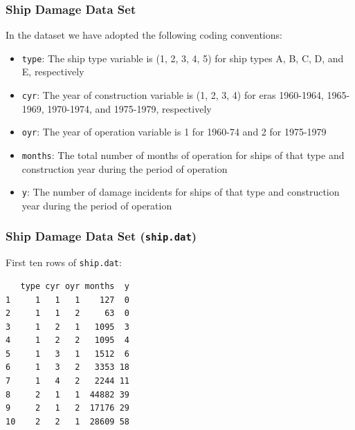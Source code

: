 \documentclass[oneside]{book}\usepackage[]{graphicx}\usepackage[svgnames]{xcolor}
\makeatletter
\newenvironment{kframe}{%
 \def\at@end@of@kframe{}%
 \ifinner\ifhmode%
  \def\at@end@of@kframe{\end{minipage}}%
  \begin{minipage}{\columnwidth}%
 \fi\fi%
 \def\FrameCommand##1{\hskip\@totalleftmargin \hskip-\fboxsep
 \colorbox{shadecolor}{##1}\hskip-\fboxsep
     \hskip-\linewidth \hskip-\@totalleftmargin \hskip\columnwidth}%
 \MakeFramed {\advance\hsize-\width
   \@totalleftmargin\z@ \linewidth\hsize
   \@setminipage}}%
 {\par\unskip\endMakeFramed%
 \at@end@of@kframe}
\newenvironment{knitrout}{}{} %
\makeatother
\begin{document}
\subsubsection*{Ship Damage Data Set}
In the dataset we have adopted the following coding conventions:
\begin{itemize}
      \item \texttt{type}: The ship type variable is (1, 2, 3, 4, 5) for ship types A, B, C, D, and E,
            respectively
      \item \texttt{cyr}: The year of construction variable is (1, 2, 3, 4) for eras 1960-1964,
            1965-1969, 1970-1974, and 1975-1979, respectively
      \item \texttt{oyr}: The year of operation variable is 1 for 1960-74 and 2 for 1975-1979
      \item \texttt{months}: The total number of months of operation for ships of that type and
            construction year during the period of operation
      \item \texttt{y}: The number of damage incidents for ships of that type and construction
            year during the period of operation
\end{itemize}
\subsubsection*{Ship Damage Data Set (\texttt{ship.dat})}
\begin{Example}{}
      First ten rows of \texttt{ship.dat}:
\begin{knitrout}
\color{fgcolor}\begin{kframe}
\begin{verbatim}
   type cyr oyr months  y
1     1   1   1    127  0
2     1   1   2     63  0
3     1   2   1   1095  3
4     1   2   2   1095  4
5     1   3   1   1512  6
6     1   3   2   3353 18
7     1   4   2   2244 11
8     2   1   1  44882 39
9     2   1   2  17176 29
10    2   2   1  28609 58
\end{verbatim}
\end{kframe}
\end{knitrout}
\end{Example}
\end{document}
